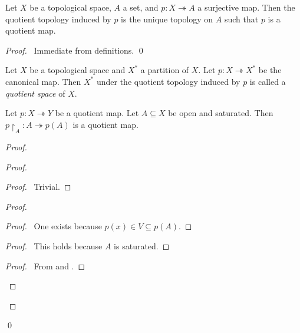 \begin{lm}
  Let $X$ be a topological space, $A$ a set, and $p : X \twoheadrightarrow A$
  a surjective map. Then the quotient topology induced by $p$ is the
  unique topology on $A$ such that $p$ is a quotient map.
\end{lm}

\begin{proof}
  \pf\ Immediate from definitions. \qed
\end{proof}

\begin{df}
  Let $X$ be a topological space and $X^*$ a partition of $X$. Let $p : X
  \twoheadrightarrow X^*$ be the canonical map. Then $X^*$ under the quotient
  topology induced by $p$ is called a \emph{quotient space} of $X$.
\end{df}

\begin{prop}
  Let $p : X \twoheadrightarrow Y$ be a quotient map. Let $A \subseteq X$ be
  open and saturated. Then $p \restriction_A : A \twoheadrightarrow p(A)$ is
  a
  quotient map.
\end{prop}

\begin{proof}
  \pf
  \begin{proof}
    \begin{proof}
      \pf\ Trivial.
    \end{proof}
    \begin{proof}
      \begin{proof}
        \pf\ One exists because $p(x) \in V \subseteq p(A)$.
      \end{proof}
      \begin{proof}
        \pf\ This holds because $A$ is saturated.
      \end{proof}
      \begin{proof}
        \pf\ From  and .
      \end{proof}
    \end{proof}
  \end{proof}
  \qed
\end{proof}

